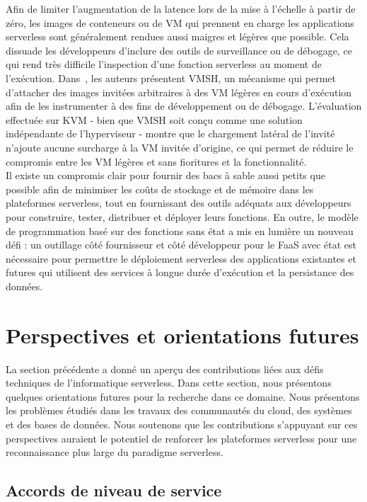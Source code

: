 Afin de limiter l'augmentation de la latence lors de la mise à l'échelle à partir de zéro, les images de conteneurs ou de VM qui prennent en charge les applications serverless sont généralement rendues aussi maigres et légères que possible. Cela dissuade les développeurs d'inclure des outils de surveillance ou de débogage, ce qui rend très difficile l'inspection d'une fonction serverless au moment de l'exécution. Dans~\cite{thalheimVMSHHypervisoragnosticGuest2022}, les auteurs présentent VMSH, un mécanisme qui permet d'attacher des images invitées arbitraires à des VM légères en cours d'exécution afin de les instrumenter à des fins de développement ou de débogage. L'évaluation effectuée sur KVM - bien que VMSH soit conçu comme une solution indépendante de l'hyperviseur - montre que le chargement latéral de l'invité n'ajoute aucune surcharge à la VM invitée d'origine, ce qui permet de réduire le compromis entre les VM légères et sans fioritures et la fonctionnalité.
\\

Il existe un compromis clair pour fournir des bacs à sable aussi petits que possible afin de minimiser les coûts de stockage et de mémoire dans les plateformes serverless, tout en fournissant des outils adéquats aux développeurs pour construire, tester, distribuer et déployer leurs fonctions. En outre, le modèle de programmation basé sur des fonctions sans état a mis en lumière un nouveau défi : un outillage côté fournisseur et côté développeur pour le FaaS avec état est nécessaire pour permettre le déploiement serverless des applications existantes et futures qui utilisent des services à longue durée d'exécution et la persistance des données.

\section{Perspectives et orientations futures}

La section précédente a donné un aperçu des contributions liées aux défis techniques de l'informatique serverless. Dans cette section, nous présentons quelques orientations futures pour la recherche dans ce domaine. Nous présentons les problèmes étudiés dans les travaux des communautés du cloud, des systèmes et des bases de données. Nous soutenons que les contributions s'appuyant sur ces perspectives auraient le potentiel de renforcer les plateformes serverless pour une reconnaissance plus large du paradigme serverless.

\subsection{Accords de niveau de service}

